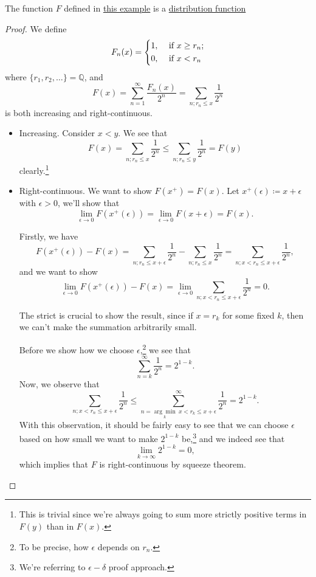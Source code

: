 \begin{lemma}\label{lma:lec7-eg:4-is-distribution-function}
	The function \(F\) defined in \hyperref[eg:lec8-3]{this example} is a \hyperref[def:distribution-function]{distribution function}
\end{lemma}
\begin{proof}
	\par We define
	\[
		F_{n}(x) = \begin{dcases}
			1, & \text{ if } x\geq r_{n} ; \\
			0, & \text{ if } x<r_{n}
		\end{dcases}
	\]
	where \(\{r_1, r_2, \dots  \}= \mathbb{Q} \), and
	\[
		F(x) = \sum_{n=1}^{\infty} \frac{F_{n}(x)}{2^n} = \sum_{n;r_{n}\leq x}\frac{1}{2^n}
	\]
	is both increasing and right-continuous.

	\begin{itemize}
		\item Increasing. Consider \(x<y\). We see that
		      \[
			      F(x) = \sum_{n;r_{n}\leq x} \frac{1}{2^n} \leq \sum_{n;r_{n}\leq y} \frac{1}{2^n} = F(y)
		      \]
		      clearly.\footnote{This is trivial since we're always going to sum more strictly positive terms in \(F(y)\) than in \(F(x)\).}
		\item Right-continuous. We want to show \(F(x^+) = F(x)\). Let \(x^+(\epsilon )\coloneqq x + \epsilon \) with \(\epsilon >0\), we'll show that
		      \[
			      \lim_{\epsilon\to 0}F(x^+(\epsilon )) =  \lim_{\epsilon \to 0} F(x + \epsilon ) = F(x).
		      \]

		      Firstly, we have
		      \[
			      F(x^+(\epsilon )) - F(x) = \sum_{n;r_{n}\leq x+\epsilon } \frac{1}{2^n} - \sum_{n;r_{n}\leq x}\frac{1}{2^n} = \sum_{n;x<r_{n}\leq x+\epsilon}\frac{1}{2^n},
		      \]
		      and we want to show
		      \[
			      \lim_{\epsilon \to 0}F(x^+(\epsilon )) - F(x) = \lim_{\epsilon \to 0}\sum_{n;x< r_{n}\leq x+\epsilon }\frac{1}{2^n} = 0.
		      \]
		      \begin{remark}
			      The strict is crucial to show the result, since if \(x = r_k\) for some fixed \(k\), then we can't make the summation arbitrarily small.
		      \end{remark}

		      \par Before we show how we choose \(\epsilon \),\footnote{To be precise, how \(\epsilon \) depends on \(r_n\).} we see that
		      \[
			      \sum_{n=k}^{\infty }\frac{1}{2^n} = 2^{1-k}.
		      \]
		      Now, we observe that
		      \[
			      \sum_{n;x< r_{n}\leq x+\epsilon }\frac{1}{2^n}\leq \sum_{n=\underset{k}{\arg\mathop{\min}}\ x< r_{k}\leq x+\epsilon }^{\infty }\frac{1}{2^n} = 2^{1-k}.
		      \]
		      With this observation, it should be fairly easy to see that we can choose \(\epsilon \) based on how small we want to make \(2^{1-k}\) be,\footnote{We're referring to \(\epsilon -\delta \) proof approach.}
		      and we indeed see that
		      \[
			      \lim_{k \to \infty} 2^{1-k} = 0,
		      \]
		      which implies that \(F\) is right-continuous by squeeze theorem.
	\end{itemize}
\end{proof}

